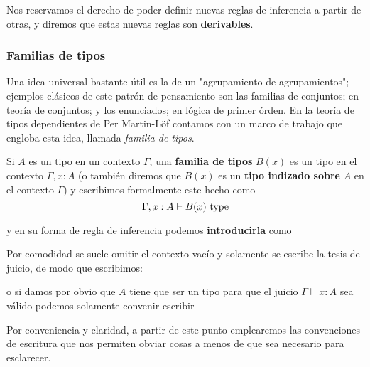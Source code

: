 \documentclass{article}
\begin{document}
        Nos reservamos el derecho de poder definir nuevas reglas de inferencia a partir de otras, y diremos que estas nuevas reglas son \textbf{derivables}.
    
    \subsubsection{Familias de tipos}
        Una idea universal bastante útil es la de un "agrupamiento de agrupamientos"; ejemplos clásicos de este patrón de pensamiento son
        las familias de conjuntos; en teoría de conjuntos; y los enunciados; en lógica de primer órden. En la teoría de tipos dependientes
        de Per Martin-Löf contamos con un marco de trabajo que engloba esta idea, 
        llamada \textit{familia de tipos}.

        \begin{definition}\label{def:familia_tipos}
            Si $A$ es un tipo en un contexto $\Gamma$, una \textbf{familia de tipos} $B(x)$ es un tipo en el contexto $\Gamma, x : A$ (o también diremos
            que $B(x)$ es un \textbf{tipo indizado sobre} $A$ en el contexto $\Gamma$) y
            escribimos formalmente este hecho como
            $$
                \Gamma, x : A \vdash B(x)\ \type
            $$

            y en su forma de regla de inferencia podemos \textbf{introducirla} como
            \begin{prooftree}
            \end{prooftree}

            Por comodidad se suele omitir el contexto vacío y solamente se escribe la tesis de juicio, de modo que escribimos:

            \begin{prooftree}
            \end{prooftree}

            o si damos por obvio que $A$ tiene que ser un tipo para que el juicio $\Gamma \vdash x : A$ sea válido podemos solamente convenir escribir
            \begin{prooftree}
            \end{prooftree}
        
            Por conveniencia y claridad, a partir de este punto emplearemos las convenciones de escritura que nos permiten obviar cosas a menos de que sea
            necesario para esclarecer.
        \end{definition}
\end{document}
